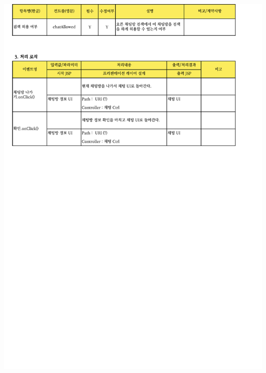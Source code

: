 {{{{{{{{{{{{{{{{{{{{{{{{{{{{{{{{{{{{{{{{{{{{{{{{{{{{{{{{{{{{{{{{{{{{\includegraphics[width=20cm]{./Figure/Analysis/Display/chat/chat_07.pdf} \\
}}}}}}}}}}}}}}}}}}}}}}}}}}}}}}}}}}}}}}}}}}}}}}}}}}}}}}}}}}}}}}}}}}}}

